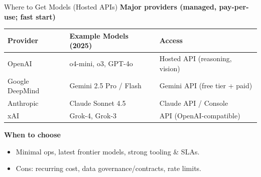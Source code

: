 \documentclass[aspectratio=169]{beamer}
\begin{document}
\begin{frame}{Where to Get Models (Hosted APIs)}
  \vspace{-0.3em}
  \textbf{Major providers (managed, pay-per-use; fast start)}
  \begin{center}
    \begin{tabular}{@{}lll@{}}
      \toprule
      Provider & Example Models (2025) & Access \\
      \midrule
      OpenAI & o4-mini, o3, GPT-4o & Hosted API (reasoning, vision) \\
      Google DeepMind & Gemini 2.5 Pro / Flash & Gemini API (free tier + paid) \\
      Anthropic & Claude Sonnet 4.5 & Claude API / Console \\
      xAI & Grok-4, Grok-3 & API (OpenAI-compatible) \\
      \bottomrule
    \end{tabular}
  \end{center}

  \vspace{0.6em}
  \textbf{When to choose}
  \begin{itemize}
    \item Minimal ops, latest frontier models, strong tooling \& SLAs.
    \item Cons: recurring cost, data governance/contracts, rate limits.
  \end{itemize}
\end{frame}
\end{document}
